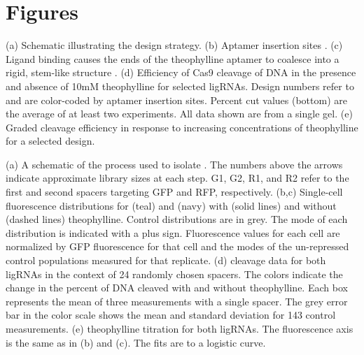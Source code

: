 \documentclass[10pt,oneside]{article}
\begin{document}
\section{Figures}



 (a) Schematic illustrating the design strategy.
%
%
 (b) Aptamer insertion sites \autocite{briner2014}.
%
%
 (c) Ligand binding causes the ends of the theophylline aptamer to coalesce into a rigid, stem-like structure \autocite{zimmerman1997}.
%
%
 (d) Efficiency of \invitro{} Cas9 cleavage of DNA in the presence and absence of 10mM theophylline for selected ligRNAs.  Design numbers refer to  and are color-coded by aptamer insertion sites.  Percent cut values (bottom) are the average of at least two experiments.  All data shown are from a single gel.
%
%
 (e) Graded cleavage efficiency in response to increasing concentrations of theophylline for a selected design.



 (a) A schematic of the process used to isolate \ligrnaF{}.  The numbers above the arrows indicate approximate library sizes at each step.  G1, G2, R1, and R2 refer to the first and second spacers targeting GFP and RFP, respectively.
 (b,c) Single-cell fluorescence distributions for \ligrnaF{} (teal) and \ligrnaB{} (navy) with (solid lines) and without (dashed lines) theophylline.  Control distributions are in grey.  The mode of each distribution is indicated with a plus sign.  Fluorescence values for each cell are normalized by GFP fluorescence for that cell and the modes of the un-repressed control populations measured for that replicate.
 (d) \Invitro{} cleavage data for both ligRNAs in the context of 24 randomly chosen spacers.  The colors indicate the change in the percent of DNA cleaved with and without theophylline.  Each box represents the mean of three measurements with a single spacer.   The grey error bar in the color scale shows the mean and standard deviation for 143 control measurements.
 (e) \Invivo{} theophylline titration for both ligRNAs.  The fluorescence axis is the same as in (b) and (c).  The fits are to a logistic curve.
 
\end{document}
